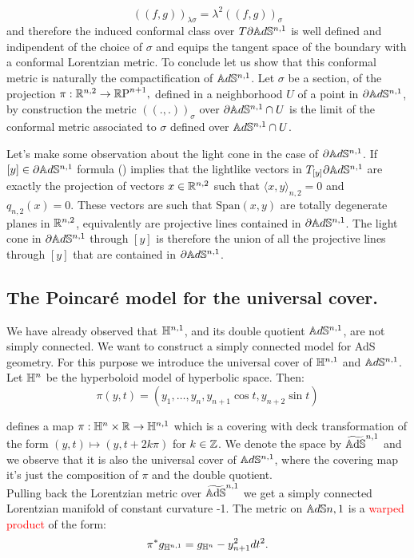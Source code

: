 \begin{equation}\label{25}
    ((f,g))_{\lambda\sigma}=\lambda^2((f,g))_{\sigma}
\end{equation} 
and therefore the induced conformal class over $T\partial\mathbb{A}d\mathbb{S}^{n,1}$ is well defined and indipendent of the choice of $\sigma$ and equips the tangent space of the boundary with a conformal Lorentzian metric. To conclude let us show that this conformal metric is naturally the compactification of $\mathbb{A}d\mathbb{S}^{n,1}$. Let $\sigma$ be a section, of the projection $\pi:\mathbb{R}^{n,2}\to \mathbb{R}\text{P}^{n+1},$ defined in a neighborhood $U$ of a point in $\partial\mathbb{A}d\mathbb{S}^{n,1}$, by construction the metric $((.,.))_\sigma$ over $\partial\mathbb{A}d\mathbb{S}^{n,1}\cap U$ is the limit of the conformal metric associated to $\sigma$ defined over $\mathbb{A}d\mathbb{S}^{n,1}\cap U$. %
\begin{observation}
Let's make some observation about the light cone in the case of $\partial\mathbb{A}d\mathbb{S}^{n,1}$. If $[y]\in\partial\mathbb{A}d\mathbb{S}^{n,1}$ formula () implies that the lightlike vectors in $T_{[y]}\partial\mathbb{A}d\mathbb{S}^{n,1}$ are exactly the projection of vectors $x\in \mathbb{R}^{n,2}$ such that $\langle x,y\rangle_{n,2}=0$ and $q_{n,2}(x)=0$. These vectors are such that $\text{Span}(x,y)$ are totally degenerate planes in $\mathbb{R}^{n,2}$, equivalently are projective lines contained in $\partial\mathbb{A}d\mathbb{S}^{n,1}$. The light cone in $\partial\mathbb{A}d\mathbb{S}^{n,1}$ through $[y]$ is therefore the union of all the projective lines through $[y]$ that are contained in $\partial\mathbb{A}d\mathbb{S}^{n,1}$.

\end{observation}


\subsection{The Poincaré model for the universal cover.}
We have already observed that $\mathbb{H}^{n,1}$, and its double quotient $\mathbb{A}d\mathbb{S}^{n,1}$, are not simply connected. We want to construct a simply connected model for AdS geometry. For this purpose we introduce the universal cover of $\mathbb{H}^{n,1}$ and $\mathbb{A}d\mathbb{S}^{n,1}$.\\
Let $\mathbb{H}^n$ be the hyperboloid model of hyperbolic space. Then: 
\[
    \pi(y,t)=(y_1,\dots,y_n,y_{n+1}\cos t,y_{n+2}\sin t)
\]

defines a map $\pi:\mathbb{H}^n\times \mathbb{R}\to \mathbb{H}^{n,1}$ which is a covering with deck transformation of the form $(y,t)\mapsto (y,t+2k\pi)$ for $k\in \mathbb{Z}$. We denote the space by $\widetilde{\mathbb{A}\mathrm{d}\mathbb{S}}^{n,1}$ and we observe that it is also the universal cover of $\mathbb{A}d\mathbb{S}^{n,1}$, where the covering map it's just the composition of $\pi$ and the double quotient.\\
Pulling back the Lorentzian metric over $\widetilde{\mathbb{A}\mathrm{d}\mathbb{S}}^{n,1}$ we get a simply connected Lorentzian manifold of constant curvature -1. The metric on $\mathbb{A}d\mathbb{S}{n,1}$ is a \textcolor{red}{warped product} of the form: 
\begin{equation}\label{metric}
     \pi^*g_{\mathbb{H}^{n,1}}=g_{\mathbb{H}^n}-y_{n+1}^{2}dt^2.
\end{equation}
   

